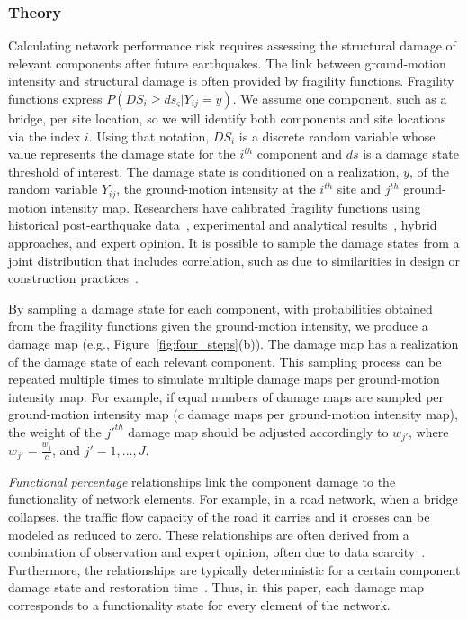 \subsubsection{Theory}
Calculating network performance risk requires assessing the structural damage of relevant components after future earthquakes. The link between ground-motion intensity and structural damage is often provided by fragility functions. Fragility functions express $P(DS_i \geq ds_{\varsigma} | Y_{ij} = y)$. We assume one component, such as a bridge, per site location, so we will identify both components and site locations via the index $i$. Using that notation, $DS_i$ is a discrete random variable whose value represents the damage state for the $i^{th}$ component and $ds$ is a damage state threshold of interest. The damage state is conditioned on a realization, $y$, of the random variable $Y_{ij}$, the ground-motion intensity at the $i^{th}$ site and $j^{th}$ ground-motion intensity map. Researchers have calibrated fragility functions using historical post-earthquake data~\cite[e.g.,][]{basoz_enhancement_1999}, experimental and analytical results~\cite[e.g.,][]{ramanathan_analytical_2010}, hybrid approaches, and expert opinion. It is possible to sample the damage states from  a joint distribution that includes correlation, such as due to similarities in design or construction practices~\cite[e.g.,][]{lee_uncertainty_2007,baker_introducing_2008}. 

By sampling a damage state for each component, with probabilities obtained from the fragility functions given the ground-motion intensity, we produce a damage map (e.g., Figure~\ref{fig:four_steps}{(b)}). The damage map has a realization of the damage state of each relevant component. This sampling process can be repeated multiple times to simulate multiple damage maps per ground-motion intensity map. For example, if equal numbers of damage maps are sampled per ground-motion intensity map ($c$ damage maps per ground-motion intensity map), the weight of the $j'^{th}$ damage map should be adjusted accordingly to $w_{j'}$, where $w_{j'} = \frac{w_j}{c}$, and $j' = 1, \ldots, J$. 

\emph{Functional percentage} relationships link the component damage to the functionality of network elements.  For example, in a road network, when a bridge collapses, the traffic flow capacity of the road it carries and it crosses can be modeled as reduced to zero. These relationships are often derived from a combination of observation and expert opinion, often due to data scarcity~\cite{werner_redars_2006}. Furthermore, the relationships are typically deterministic for a certain component damage state and restoration time~\cite{werner_redars_2006}. Thus, in this paper, each damage map corresponds to a functionality state for every element of the network.

